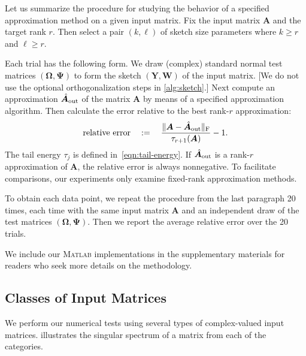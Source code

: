 \documentclass[final]{siamart1116}
\numberwithin{equation}{section}
\numberwithin{theorem}{section}
\numberwithin{figure}{section}
\newcommand{\mtx}[1]{\bm{#1}}
\newcommand{\norm}[1]{\Vert #1 \Vert}
\newcommand{\fnorm}[1]{\norm{#1}_{\mathrm{F}}}
\begin{document}
Let us summarize the procedure
for studying the behavior of a specified
approximation method on a given input matrix.
Fix the input matrix $\mtx{A}$ and the target rank $r$.
Then select a pair $(k, \ell)$ of sketch size parameters where $k \geq r$ and $\ell \geq r$.

Each trial has the following form.
We draw (complex) standard normal test matrices $(\mtx{\Omega}, \mtx{\Psi})$
to form the sketch $(\mtx{Y}, \mtx{W})$ of the input matrix.
[We do not use the optional orthogonalization steps in \cref{alg:sketch}.]
Next compute an approximation $\hat{\mtx{A}}_{\rm out}$ of the matrix $\mtx{A}$
by means of a specified approximation algorithm.
Then calculate the error relative to the best rank-$r$ approximation:
\begin{equation} \label{eqn:relative-error}
\textrm{relative error} \quad:=\quad
\frac{\fnorm{ \mtx{A} - \hat{\mtx{A}}_{\rm out} }}{ \tau_{r+1}(\mtx{A}) }
 - 1.
\end{equation}
The tail energy $\tau_j$ is defined in~\eqref{eqn:tail-energy}.
If $\hat{\mtx{A}}_{\rm out}$ is a rank-$r$ approximation of $\mtx{A}$,
the relative error is always nonnegative.  To facilitate comparisons,
our experiments only examine fixed-rank approximation methods.

To obtain each data point, we repeat the procedure from the last paragraph 20 times,
each time with the same input matrix $\mtx{A}$
and an independent draw of the test matrices $(\mtx{\Omega}, \mtx{\Psi})$.
Then we report the average relative error over the 20 trials.

We include our \textsc{Matlab} implementations in the supplementary materials
for readers who seek more details on the methodology.





\subsection{Classes of Input Matrices}
\label{sec:input-matrix-examples}

We perform our numerical tests using several types of
complex-valued input matrices.
 illustrates the singular spectrum
of a matrix from each of the categories.
\end{document}
